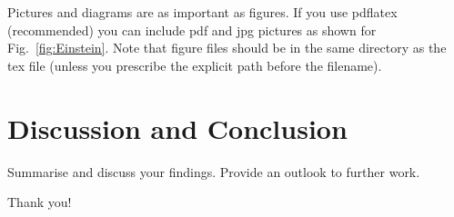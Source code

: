 \documentclass[reprint,amsmath,amssymb,floatfix,biblatex]{revtex4-2}
\begin{document}
Pictures and diagrams are as important as figures. If you use pdflatex (recommended) you can include pdf and jpg pictures as shown for Fig.~\ref{fig:Einstein}.
Note that figure files should be in the same directory as the tex file (unless you prescribe the explicit path before the filename).

\newpage

\section{Discussion and Conclusion}

Summarise and discuss your findings. Provide an outlook to further work.

\begin{acknowledgments}
Thank you!
\end{acknowledgments}

\end{document}
